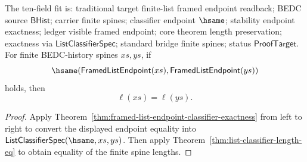 \begin{theorem}
\label{thm:framed-list-endpoint-length-preservation}
The ten-field fit is: traditional target finite-list framed endpoint readback;
BEDC source $\mathsf{BHist}$; carrier finite spines; classifier endpoint
$\hsame$; stability endpoint exactness; ledger visible framed endpoint; core
theorem length preservation; exactness via $\mathsf{ListClassifierSpec}$;
standard bridge finite spines; status $\mathsf{ProofTarget}$. For finite
BEDC-history spines $xs,ys$, if
$$
\hsame(\mathsf{FramedListEndpoint}(xs),\mathsf{FramedListEndpoint}(ys))
$$
holds, then
$$
\ell(xs)=\ell(ys).
$$
\end{theorem}
\begin{proof}
Apply Theorem~\ref{thm:framed-list-endpoint-classifier-exactness} from left to
right to convert the displayed endpoint equality into
$\mathsf{ListClassifierSpec}(\hsame,xs,ys)$. Then apply
Theorem~\ref{thm:list-classifier-length-eq} to obtain equality of the finite
spine lengths.
\end{proof}
